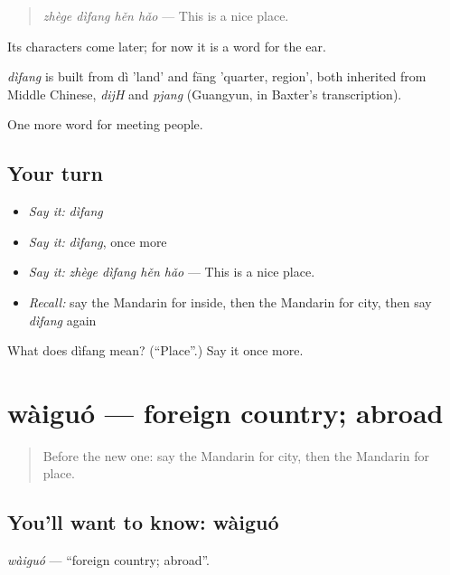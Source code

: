 \begin{quote}
\emph{zhège dìfang hěn hǎo} — This is a nice place.
\end{quote}

Its characters come later; for now it is a word for the ear.

\begin{cousinweb}
\emph{dìfang} is built from dì 'land' and fāng 'quarter, region', both inherited from Middle Chinese, \emph{dijH} and \emph{pjang} (Guangyun, in Baxter's transcription).
\end{cousinweb}

\begin{grammarlens}[title={What you've built}]
One more word for meeting people.
\end{grammarlens}

\subsection*{Your turn}
\begin{itemize}
\raggedright
  \item \emph{Say it:} \emph{dìfang}
  \item \emph{Say it:} \emph{dìfang}, once more
  \item \emph{Say it:} \emph{zhège dìfang hěn hǎo} — This is a nice place.
  \item \emph{Recall:} say the Mandarin for inside, then the Mandarin for city, then say \emph{dìfang} again
\end{itemize}

\begin{tcolorbox}[breakable,colback=teal!4,colframe=teal!35!black,title={Before you move on}]
What does dìfang mean? (\textquotedblleft{}Place\textquotedblright{}.) Say it once more.
\end{tcolorbox}
\section[wàiguó]{wàiguó — foreign country; abroad}

\label{lesson:ZH-C81-waiguo}



\begin{quote}
Before the new one: say the Mandarin for city, then the Mandarin for place.
\end{quote}

\subsection*{You'll want to know: wàiguó}
\emph{wàiguó} — \textquotedblleft{}foreign country; abroad\textquotedblright{}.

